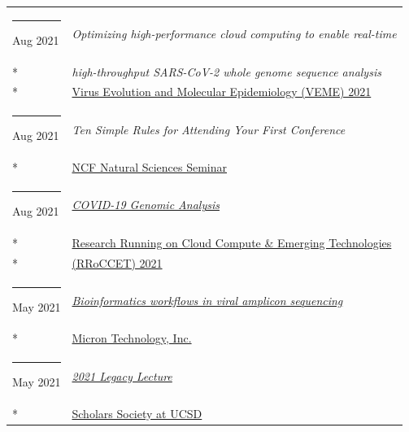 \documentclass[margin,line]{res}
\begin{document}
\begin{resume}
\begin{longtable}{@{}p{0.7in}p{4in}}
\hspace*{-4mm} \rule{-1mm}{5mm} Aug 2021 & \textit{Optimizing high-performance cloud computing to enable real-time}\\*
\hspace*{-4mm} & \hspace{4mm} \textit{high-throughput SARS-CoV-2 whole genome sequence analysis}\\*
\hspace*{-4mm} & \hspace{4mm} \href{https://rega.kuleuven.be/cev/veme-workshop/2021}{Virus Evolution and Molecular Epidemiology (VEME) 2021}\\
\hspace*{-4mm} \rule{-1mm}{5mm} Aug 2021 & \textit{Ten Simple Rules for Attending Your First Conference}\\*
\hspace*{-4mm} & \hspace{4mm} \href{https://www.ncf.edu/academics/undergraduate-program/division-of-natural-sciences/natural-sciences/}{NCF Natural Sciences Seminar}\\
\hspace*{-4mm} \rule{-1mm}{5mm} Aug 2021 & \href{https://na.eventscloud.com/website/23042/}{\textit{COVID-19 Genomic Analysis}}\\*
\hspace*{-4mm} & \hspace{4mm} \href{https://na.eventscloud.com/website/23042/}{Research Running on Cloud Compute \& Emerging Technologies}\\*
\hspace*{-4mm} & \hspace{4mm} \href{https://na.eventscloud.com/website/23042/}{(RRoCCET) 2021}\\
\hspace*{-4mm} \rule{-1mm}{5mm} May 2021 & \href{https://www.micron.com/}{\textit{Bioinformatics workflows in viral amplicon sequencing}}\\*
\hspace*{-4mm} & \hspace{4mm} \href{https://www.micron.com/}{Micron Technology, Inc.}\\
\hspace*{-4mm} \rule{-1mm}{5mm} May 2021 & \href{https://studentorg.ucsd.edu/Home/Details/12340}{\textit{2021 Legacy Lecture}}\\*
\hspace*{-4mm} & \hspace{4mm} \href{https://studentorg.ucsd.edu/Home/Details/12340}{Scholars Society at UCSD}\\

\end{longtable}
\end{resume}
\end{document}
